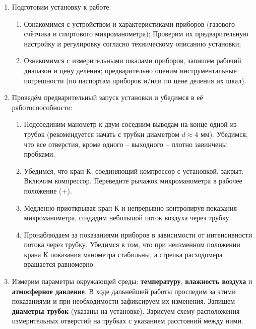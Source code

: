 \documentclass[a4paper,12pt]{article} %
\begin{document}
\begin{enumerate}
\renewcommand{\labelenumi}{\textbf{\Roman{enumi}.}}
\renewcommand{\labelenumii}{\arabic{enumii}.}

\item Подготовим установку к работе:
	\begin{enumerate}
	\item
	Ознакомимся  с  устройством  и  характеристиками  приборов  (газового счётчика и 			спиртового микроманометра); Проверим их   предварительную настройку и регулировку 			согласно техническому описанию установки;
	\item 
	Ознакомимся с измерительными шкалами приборов, запишем рабочий диапазон и цену деления; предварительно оценим инструментальные погрешности (по паспортам приборов и/или по цене деления их шкал).
	\end{enumerate}
	
\item Проведём предварительный запуск установки и убедимся в её работоспособности:
	\begin{enumerate}
	\item Подсоединим манометр к двум соседним выводам на конце одной из трубок 				(рекомендуется начать с трубки диаметром $d \approx 4$ мм). Убедимся, что все отверстия, кроме одного -- выходного -- плотно завинчены пробками.
	\item Убедимся, что кран К, соединяющий компрессор с установкой, закрыт. Включим компрессор. Переведите рычажок микроманометра в рабочее положение (+).
	\item Медленно приоткрывая кран К и непрерывно контролируя показания микроманометра, создадим небольшой поток воздуха через трубку. 
	\item Пронаблюдаем за показаниями приборов в зависимости от интенсивности потока  через  трубку.  Убедимся в том,  что  при  неизменном  положении крана К показания манометра стабильны, а стрелка расходомера вращается равномерно.
	\end{enumerate}
	
\item Измерим параметры окружающей среды: \textbf{температуру}, \textbf{влажность воздуха} и \textbf{атмосферное давление}. В ходе дальнейшей работы проследим за этими показаниями и при необходимости зафиксируем их изменения. Запишем \textbf{диаметры трубок} (указаны на установке). Зарисуем схему расположения  измерительных отверстий  на трубках с  указанием  расстояний между ними.


\end{enumerate}
\end{document}

